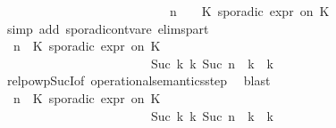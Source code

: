 \begin{isabellebody}
\ \ \ \ \ \ \ \ \ \ \ \ \ \ \ \ \ \ \ \ \ \ \ \ \ \ {\isasymhookrightarrow}{\isacharparenleft}{\isasymGamma}{\isacharcomma}\ n\ {\isasymturnstile}\ {\isasymPsi}\ {\isasymtriangleright}\ {\isacharparenleft}{\isacharparenleft}K\ sporadic{\isasymsharp}\ {\isasymtau}\isactrlsub e\isactrlsub x\isactrlsub p\isactrlsub r\ on\ K\ {\isacharhash}\ {\isasymPhi}{\isacharparenright}{\isacharparenright}{\isacartoucheclose}\isanewline
\ \ \ \ \ \ \ \ \ \ \ \ \isamarkupfalse%
\ {\isacharparenleft}simp\ add{\isacharcolon}\ sporadic{\isacharunderscore}on{\isacharunderscore}tvar{\isacharunderscore}e{}\ elims{\isacharunderscore}part{\isacharparenright}\isanewline
\ \ \ \ \ \ \ \ \ \ \isamarkupfalse%
\ \isamarkupfalse%
\ {\isacartoucheopen}{\isacharparenleft}{\isacharparenleft}{\isasymGamma}{\isacharcomma}\ n\ {\isasymturnstile}\ {\isacharparenleft}{\isacharparenleft}K\ sporadic{\isasymsharp}\ {\isasymtau}\isactrlsub e\isactrlsub x\isactrlsub p\isactrlsub r\ on\ K\ {\isacharhash}\ {\isasymPsi}{\isacharparenright}\ {\isasymtriangleright}\ {\isasymPhi}{\isacharparenright}\isanewline
\ \ \ \ \ \ \ \ \ \ \ \ \ \ \ \ \ \ \ \ \ \ \ \ {\isasymhookrightarrow}\isactrlbsup Suc\ k\isactrlesup \ {\isacharparenleft}{\isasymGamma}\isactrlsub k{\isacharcomma}\ Suc\ n\ {\isasymturnstile}\ {\isasymPsi}\isactrlsub k\ {\isasymtriangleright}\ {\isasymPhi}\isactrlsub k{\isacharparenright}{\isacharparenright}{\isacartoucheclose}\isanewline
\ \ \ \ \ \ \ \ \ \ \ \ \isamarkupfalse%
\ relpowp{\isacharunderscore}Suc{\isacharunderscore}I{}{\isacharbrackleft}of\ {\isacartoucheopen}operational{\isacharunderscore}semantics{\isacharunderscore}step{\isacartoucheclose}{\isacharbrackright}\ \isamarkupfalse%
\ blast\isanewline
\ \ \ \ \ \ \ \ \ \ \isamarkupfalse%
\ {\isacharasterisk}\ \isamarkupfalse%
\ {\isacartoucheopen}{\isacharparenleft}{\isacharparenleft}{\isasymGamma}{\isacharcomma}\ n\ {\isasymturnstile}\ {\isacharparenleft}{\isacharparenleft}K\ sporadic{\isasymsharp}\ {\isasymtau}\isactrlsub e\isactrlsub x\isactrlsub p\isactrlsub r\ on\ K\ {\isacharhash}\ {\isasymPsi}{\isacharparenright}\ {\isasymtriangleright}\ {\isasymPhi}{\isacharparenright}\isanewline
\ \ \ \ \ \ \ \ \ \ \ \ \ \ \ \ \ \ \ \ \ \ \ \ {\isasymhookrightarrow}\isactrlbsup Suc\ k\isactrlesup \ {\isacharparenleft}{\isasymGamma}\isactrlsub k{\isacharcomma}\ Suc\ n\ {\isasymturnstile}\ {\isasymPsi}\isactrlsub k\ {\isasymtriangleright}\ {\isasymPhi}\isactrlsub k{\isacharparenright}{\isacharparenright}\isanewline

\end{isabellebody}
